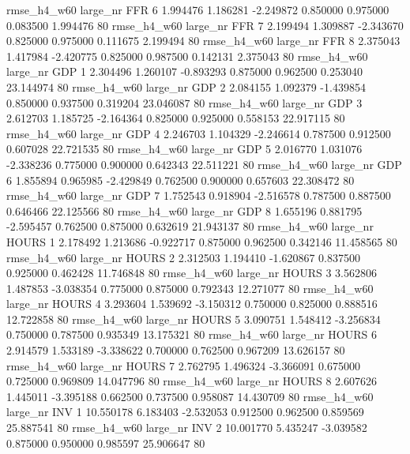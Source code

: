  rmse_h4_w60   large_nr      FFR                 6  1.994476  1.186281  -2.249872 0.850000 0.975000  0.083500    1.994476 80
 rmse_h4_w60   large_nr      FFR                 7  2.199494  1.309887  -2.343670 0.825000 0.975000  0.111675    2.199494 80
 rmse_h4_w60   large_nr      FFR                 8  2.375043  1.417984  -2.420775 0.825000 0.987500  0.142131    2.375043 80
 rmse_h4_w60   large_nr      GDP                 1  2.304496  1.260107  -0.893293 0.875000 0.962500  0.253040   23.144974 80
 rmse_h4_w60   large_nr      GDP                 2  2.084155  1.092379  -1.439854 0.850000 0.937500  0.319204   23.046087 80
 rmse_h4_w60   large_nr      GDP                 3  2.612703  1.185725  -2.164364 0.825000 0.925000  0.558153   22.917115 80
 rmse_h4_w60   large_nr      GDP                 4  2.246703  1.104329  -2.246614 0.787500 0.912500  0.607028   22.721535 80
 rmse_h4_w60   large_nr      GDP                 5  2.016770  1.031076  -2.338236 0.775000 0.900000  0.642343   22.511221 80
 rmse_h4_w60   large_nr      GDP                 6  1.855894  0.965985  -2.429849 0.762500 0.900000  0.657603   22.308472 80
 rmse_h4_w60   large_nr      GDP                 7  1.752543  0.918904  -2.516578 0.787500 0.887500  0.646466   22.125566 80
 rmse_h4_w60   large_nr      GDP                 8  1.655196  0.881795  -2.595457 0.762500 0.875000  0.632619   21.943137 80
 rmse_h4_w60   large_nr    HOURS                 1  2.178492  1.213686  -0.922717 0.875000 0.962500  0.342146   11.458565 80
 rmse_h4_w60   large_nr    HOURS                 2  2.312503  1.194410  -1.620867 0.837500 0.925000  0.462428   11.746848 80
 rmse_h4_w60   large_nr    HOURS                 3  3.562806  1.487853  -3.038354 0.775000 0.875000  0.792343   12.271077 80
 rmse_h4_w60   large_nr    HOURS                 4  3.293604  1.539692  -3.150312 0.750000 0.825000  0.888516   12.722858 80
 rmse_h4_w60   large_nr    HOURS                 5  3.090751  1.548412  -3.256834 0.750000 0.787500  0.935349   13.175321 80
 rmse_h4_w60   large_nr    HOURS                 6  2.914579  1.533189  -3.338622 0.700000 0.762500  0.967209   13.626157 80
 rmse_h4_w60   large_nr    HOURS                 7  2.762795  1.496324  -3.366091 0.675000 0.725000  0.969809   14.047796 80
 rmse_h4_w60   large_nr    HOURS                 8  2.607626  1.445011  -3.395188 0.662500 0.737500  0.958087   14.430709 80
 rmse_h4_w60   large_nr      INV                 1 10.550178  6.183403  -2.532053 0.912500 0.962500  0.859569   25.887541 80
 rmse_h4_w60   large_nr      INV                 2 10.001770  5.435247  -3.039582 0.875000 0.950000  0.985597   25.906647 80
